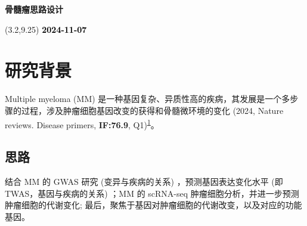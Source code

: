 \documentclass[
]{article}
\author{}
\date{\vspace{-2.5em}}
\begin{document}
\begin{titlepage} 
\begin{center} \textbf{\huge 骨髓瘤思路设计}
\vspace{4em} \begin{textblock}{10}(3.2,9.25)
\huge \textbf{\textcolor{black}{2024-11-07}}
\end{textblock} \end{center} \end{titlepage}
\restoregeometry


\begin{center}\vspace{1.5cm}\end{center}\tableofcontents

\begin{center}\vspace{1.5cm}\end{center}\listoffigures

\begin{center}\vspace{1.5cm}\end{center}\listoftables

\newpage


\hypertarget{abstract}{%
\section{研究背景}\label{abstract}}

Multiple myeloma (MM) 是一种基因复杂、异质性高的疾病，其发展是一个多步骤的过程，涉及肿瘤细胞基因改变的获得和骨髓微环境的变化 (2024, Nature reviews. Disease primers, \textbf{IF:76.9}, Q1)\textsuperscript{\protect\hyperlink{ref-MultipleMyelomMalard2024}{1}}。

\hypertarget{introduction}{%
\subsection{思路}\label{introduction}}

结合 MM 的 GWAS 研究 (变异与疾病的关系) ，预测基因表达变化水平 (即TWAS，基因与疾病的关系) ；MM 的 scRNA-seq 肿瘤细胞分析，并进一步预测肿瘤细胞的代谢变化; 最后，聚焦于基因对肿瘤细胞的代谢改变，以及对应的功能基因。
\end{document}
